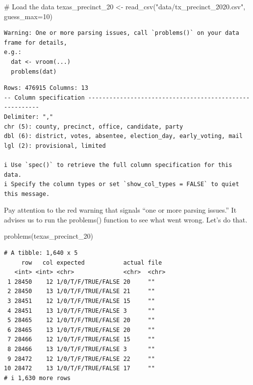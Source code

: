 \documentclass[
  letterpaper,
  DIV=11,
  numbers=noendperiod]{scrreprt}
\newenvironment{Shaded}{\begin{snugshade}}{\end{snugshade}}
\newcommand{\AttributeTok}[1]{\textcolor[rgb]{0.40,0.45,0.13}{#1}}
\newcommand{\CommentTok}[1]{\textcolor[rgb]{0.37,0.37,0.37}{#1}}
\newcommand{\DecValTok}[1]{\textcolor[rgb]{0.68,0.00,0.00}{#1}}
\newcommand{\FunctionTok}[1]{\textcolor[rgb]{0.28,0.35,0.67}{#1}}
\newcommand{\NormalTok}[1]{\textcolor[rgb]{0.00,0.23,0.31}{#1}}
\newcommand{\OtherTok}[1]{\textcolor[rgb]{0.00,0.23,0.31}{#1}}
\newcommand{\StringTok}[1]{\textcolor[rgb]{0.13,0.47,0.30}{#1}}
\begin{document}
\begin{Shaded}
\begin{Highlighting}[]
\CommentTok{\# Load the data}
\NormalTok{texas\_precinct\_20 }\OtherTok{\textless{}{-}} \FunctionTok{read\_csv}\NormalTok{(}\StringTok{"data/tx\_precinct\_2020.csv"}\NormalTok{, }\AttributeTok{guess\_max=}\DecValTok{10}\NormalTok{)}
\end{Highlighting}
\end{Shaded}

\begin{verbatim}
Warning: One or more parsing issues, call `problems()` on your data frame for details,
e.g.:
  dat <- vroom(...)
  problems(dat)
\end{verbatim}

\begin{verbatim}
Rows: 476915 Columns: 13
-- Column specification --------------------------------------------------------
Delimiter: ","
chr (5): county, precinct, office, candidate, party
dbl (6): district, votes, absentee, election_day, early_voting, mail
lgl (2): provisional, limited

i Use `spec()` to retrieve the full column specification for this data.
i Specify the column types or set `show_col_types = FALSE` to quiet this message.
\end{verbatim}

Pay attention to the red warning that signals ``one or more parsing
issues.'' It advises us to run the problems() function to see what went
wrong. Let's do that.

\begin{Shaded}
\begin{Highlighting}[]
\FunctionTok{problems}\NormalTok{(texas\_precinct\_20)}
\end{Highlighting}
\end{Shaded}

\begin{verbatim}
# A tibble: 1,640 x 5
     row   col expected           actual file 
   <int> <int> <chr>              <chr>  <chr>
 1 28450    12 1/0/T/F/TRUE/FALSE 20     ""   
 2 28450    13 1/0/T/F/TRUE/FALSE 21     ""   
 3 28451    12 1/0/T/F/TRUE/FALSE 15     ""   
 4 28451    13 1/0/T/F/TRUE/FALSE 3      ""   
 5 28465    12 1/0/T/F/TRUE/FALSE 20     ""   
 6 28465    13 1/0/T/F/TRUE/FALSE 20     ""   
 7 28466    12 1/0/T/F/TRUE/FALSE 15     ""   
 8 28466    13 1/0/T/F/TRUE/FALSE 3      ""   
 9 28472    12 1/0/T/F/TRUE/FALSE 22     ""   
10 28472    13 1/0/T/F/TRUE/FALSE 17     ""   
# i 1,630 more rows
\end{verbatim}
\end{document}
